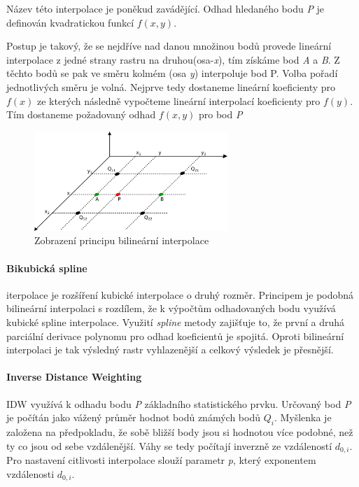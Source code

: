 \documentclass[a4paper,12pt]{report}
\begin{document}
Název této interpolace je poněkud zavádějící. Odhad hledaného bodu \emph{P} je definován kvadratickou funkcí $f(x,y)$. 

Postup je takový, že  se nejdříve nad danou množinou bodů provede lineární interpolace z jedné strany rastru na druhou(osa-\emph{x}), tím získáme bod \emph{A} a \emph{B}. Z těchto bodů se  pak ve směru kolmém (osa \emph{y}) interpoluje bod P. Volba pořadí jednotlivých směru je volná. Nejprve tedy dostaneme lineární koeficienty pro $f(x)$ ze kterých  následně vypočteme lineární interpolací koeficienty  pro $f(y)$. Tím dostaneme požadovaný odhad $f(x,y)$  pro bod \emph{P}



  
\begin{figure}[h!]
    \centering
    \includegraphics[width=0.65\textwidth]{./img/interpolace/bilinear.png}
    \caption[Bilinear interpol.]{\centering  Zobrazení principu bilineární interpolace \footnotemark}
 \end{figure}   



\paragraph{Bikubická spline} iterpolace je rozšíření kubické interpolace o druhý rozměr. Principem je podobná bilineární interpolaci s rozdílem, že k výpočtům odhadovaných bodu využívá kubické spline interpolace.  Využití \textit{spline} metody zajišťuje to, že první a druhá parciální derivace polynomu pro odhad koeficientů je spojitá. Oproti bilineární interpolaci je tak výsledný rastr vyhlazenější a celkový výsledek je přesnější. 



\paragraph*{Inverse Distance Weighting}
\acs{IDW} využívá k odhadu bodu \emph{P} základního statistického prvku. Určovaný bod \emph{P}  je počítán jako vážený průměr hodnot  bodů známých bodů $Q_{i}$.  Myšlenka je založena na předpokladu, že sobě bližší body jsou si hodnotou více podobné, než ty co jsou od sebe vzdálenější. Váhy se tedy počítají inverzně ze vzdáleností $d_{0,i}$. Pro nastavení citlivosti interpolace slouží parametr \emph{p}, který exponentem  vzdálenosti $d_{0,i}$. \cite{spatialinter}
\end{document}
